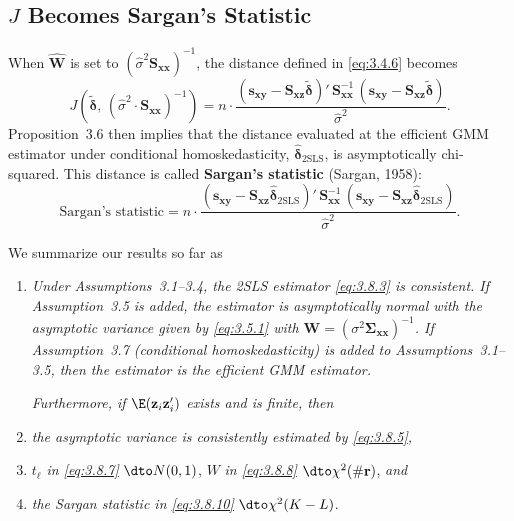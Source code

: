 \subsection*{$J$ Becomes Sargan's Statistic}

When $\hat{\mathbf{W}}$ is set to $(\hat{\sigma}^2 \mathbf{S}_{\mathbf{xx}})^{-1}$, the distance
defined in \eqref{eq:3.4.6} becomes
\begin{equation}
  J(\tilde{\boldsymbol{\delta}},\, (\hat{\sigma}^2 \cdot \mathbf{S}_{\mathbf{xx}})^{-1})
  = n \cdot \frac{(\mathbf{s}_{\mathbf{xy}}
    - \mathbf{S}_{\mathbf{xz}} \tilde{\boldsymbol{\delta}})'\,
    \mathbf{S}_{\mathbf{xx}}^{-1}\,
    (\mathbf{s}_{\mathbf{xy}}
    - \mathbf{S}_{\mathbf{xz}} \tilde{\boldsymbol{\delta}})}
    {\hat{\sigma}^2}.
  \label{eq:3.8.9}
\end{equation}
Proposition~3.6 then implies that the distance evaluated at the efficient GMM estimator
under conditional homoskedasticity, $\hat{\boldsymbol{\delta}}_{\text{2SLS}}$, is asymptotically chi-squared.
This distance is called \textbf{Sargan's statistic} (Sargan, 1958):
\begin{equation}
  \text{Sargan's statistic}
  = n \cdot \frac{(\mathbf{s}_{\mathbf{xy}}
    - \mathbf{S}_{\mathbf{xz}} \hat{\boldsymbol{\delta}}_{\text{2SLS}})'\,
    \mathbf{S}_{\mathbf{xx}}^{-1}\,
    (\mathbf{s}_{\mathbf{xy}}
    - \mathbf{S}_{\mathbf{xz}} \hat{\boldsymbol{\delta}}_{\text{2SLS}})}
    {\hat{\sigma}^2}.
  \label{eq:3.8.10}
\end{equation}

We summarize our results so far as

\begin{proposition}
\label{prop:3.9}
\begin{enumerate}[label=(\alph*)]
\item \emph{Under Assumptions~3.1--3.4, the 2SLS estimator \eqref{eq:3.8.3} is consistent.
  If Assumption~3.5 is added, the estimator is asymptotically normal with the asymptotic
  variance given by \eqref{eq:3.5.1} with
  $\mathbf{W} = (\sigma^2 \boldsymbol{\Sigma}_{\mathbf{xx}})^{-1}$.
  If Assumption~3.7 (conditional homoskedasticity) is added to Assumptions~3.1--3.5, then
  the estimator is the efficient GMM estimator.}

\emph{Furthermore, if $\E(\mathbf{z}_i \mathbf{z}_i')$ exists and is finite, then}

\item \emph{the asymptotic variance is consistently estimated by \eqref{eq:3.8.5},}

\item $t_\ell$ \emph{in \eqref{eq:3.8.7}} $\dto N(0,1)$, $W$ \emph{in \eqref{eq:3.8.8}}
  $\dto \chi^2(\#\mathbf{r})$, \emph{and}

\item \emph{the Sargan statistic in \eqref{eq:3.8.10}} $\dto \chi^2(K - L)$.
\end{enumerate}
\end{proposition}

